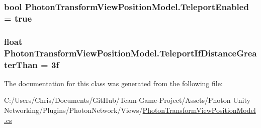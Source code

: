 \subsubsection[{\texorpdfstring{Teleport\+Enabled}{TeleportEnabled}}]{\setlength{\rightskip}{0pt plus 5cm}bool Photon\+Transform\+View\+Position\+Model.\+Teleport\+Enabled = true}\hypertarget{class_photon_transform_view_position_model_a8e36aa06dc6644a53bd2d87844434e84}{}\label{class_photon_transform_view_position_model_a8e36aa06dc6644a53bd2d87844434e84}
\subsubsection[{\texorpdfstring{Teleport\+If\+Distance\+Greater\+Than}{TeleportIfDistanceGreaterThan}}]{\setlength{\rightskip}{0pt plus 5cm}float Photon\+Transform\+View\+Position\+Model.\+Teleport\+If\+Distance\+Greater\+Than = 3f}\hypertarget{class_photon_transform_view_position_model_a98c785fa35877aae22620b6533a15cd8}{}\label{class_photon_transform_view_position_model_a98c785fa35877aae22620b6533a15cd8}


The documentation for this class was generated from the following file\+:\begin{DoxyCompactItemize}
\item 
C\+:/\+Users/\+Chris/\+Documents/\+Git\+Hub/\+Team-\/\+Game-\/\+Project/\+Assets/\+Photon Unity Networking/\+Plugins/\+Photon\+Network/\+Views/\hyperlink{_photon_transform_view_position_model_8cs}{Photon\+Transform\+View\+Position\+Model.\+cs}\end{DoxyCompactItemize}
